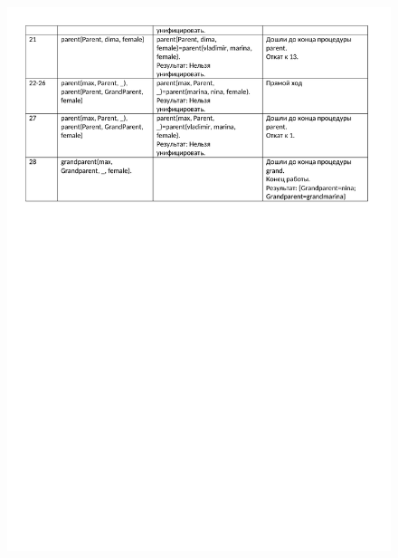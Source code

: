 \begin{figure}[H]
	\begin{center}
		\includegraphics[scale=0.85]{img/14.2.pdf}
	\end{center}
	
\end{figure}
